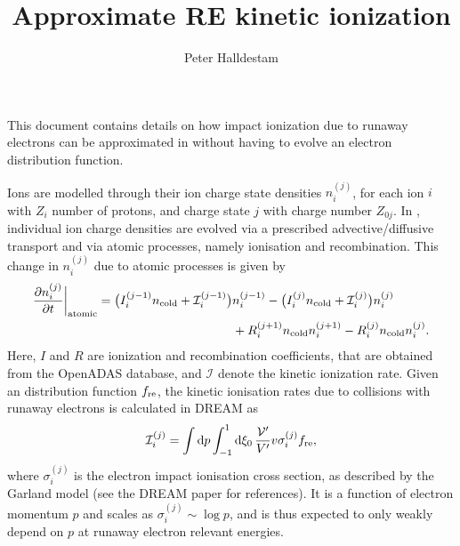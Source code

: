 \documentclass{notes}
\renewcommand{\ne}{n_{\rm cold}}
\newcommand{\fre}{f_{\rm re}}
\newcommand{\nij}[2]{n_{#1}^{(#2)}}
\newcommand{\Iij}[2]{I_{#1}^{(#2)}}
\newcommand{\Rij}[2]{R_{#1}^{(#2)}}
\newcommand{\kinIij}[2]{\mathcal{I}_{#1}^{(#2)}}
\newcommand{\sigmaij}{\sigma_i^{(j)}}
\newcommand{\Vp}{\mathcal{V}'}
\newcommand{\VpVol}{V'}
\begin{document}
\title{Approximate RE kinetic ionization}
\author{Peter Halldestam}
    \maketitle

    \noindent
    This document contains details on how impact ionization due to runaway electrons can be approximated in \DREAM\: without having to evolve an electron distribution function.

    Ions are modelled through their ion charge state densities $\nij{i}{j}$, for each ion $i$ with $Z_i$ number of protons, and charge state $j$ with charge number $Z_{0j}$.
    In \DREAM\:, individual ion charge densities are evolved via a prescribed advective/diffusive transport and via atomic processes, namely ionisation and recombination.
    This change in $\nij{i}{j}$ due to atomic processes is given by
    \begin{align}
        \pdv{\nij{i}{j}}{t}\bigg|_{\rm atomic}
        =\big(\Iij{i}{j-1} \ne + \kinIij{i}{j-1}\big) &\nij{i}{j-1}
        -\big(\Iij{i}{j} \ne + \kinIij{i}{j}\big) \nij{i}{j}\\
        &+\Rij{i}{j+1} \ne \nij{i}{j+1}
        -\Rij{i}{j} \ne \nij{i}{j}.
        \label{eq:ion_evolution}
   \end{align}
   Here, $I$ and $R$ are ionization and recombination coefficients, that are obtained from the OpenADAS database, and $\mathcal{I}$ denote the kinetic ionization rate.
   Given an distribution function $\fre$, the kinetic ionisation rates due to collisions with runaway electrons is calculated in DREAM as
   \begin{align}
       \kinIij{i}{j}
       =\int\dd{p}\int_{-1}^1\dd{\xi_0}\frac{\Vp}{\VpVol}v\sigmaij\fre,
       \label{eq:impact_ionisation}
   \end{align}
   where $\sigmaij$ is the electron impact ionisation cross section, as described by the Garland model (see the DREAM paper for references).
   It is a function of electron momentum $p$ and scales as $\sigmaij\sim\log p$, and is thus expected to only weakly depend on $p$ at runaway electron relevant energies.
\end{document}
